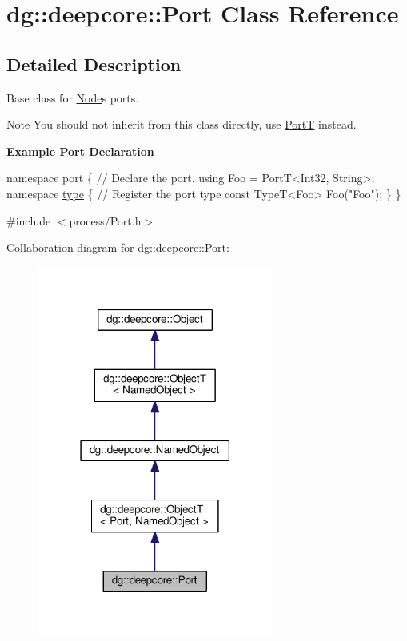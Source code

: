 \hypertarget{classdg_1_1deepcore_1_1_port}{}\section{dg\+:\+:deepcore\+:\+:Port Class Reference}
\label{classdg_1_1deepcore_1_1_port}


\subsection{Detailed Description}
Base class for \hyperlink{classdg_1_1deepcore_1_1_node}{Node}\textquotesingle{}s ports. 

\begin{DoxyNote}{Note}
You should not inherit from this class directly, use \hyperlink{structdg_1_1deepcore_1_1_port_t}{PortT} instead.
\end{DoxyNote}
{\bfseries Example \hyperlink{classdg_1_1deepcore_1_1_port}{Port} Declaration} 
\begin{DoxyCode}
\textcolor{keyword}{namespace }port \{
    \textcolor{comment}{// Declare the port.}
    \textcolor{keyword}{using} Foo = PortT<Int32, String>;
    \textcolor{keyword}{namespace }\hyperlink{classdg_1_1deepcore_1_1_object_a80356589437cb086680c6b5fbd8044d4}{type} \{
        \textcolor{comment}{// Register the port type}
        \textcolor{keyword}{const} TypeT<Foo> Foo(\textcolor{stringliteral}{"Foo"});
    \}
\}
\end{DoxyCode}
 

{\ttfamily \#include $<$process/\+Port.\+h$>$}



Collaboration diagram for dg\+:\+:deepcore\+:\+:Port\+:
\nopagebreak
\begin{figure}[H]
\begin{center}
\leavevmode
\includegraphics[width=219pt]{classdg_1_1deepcore_1_1_port__coll__graph}
\end{center}
\end{figure}
